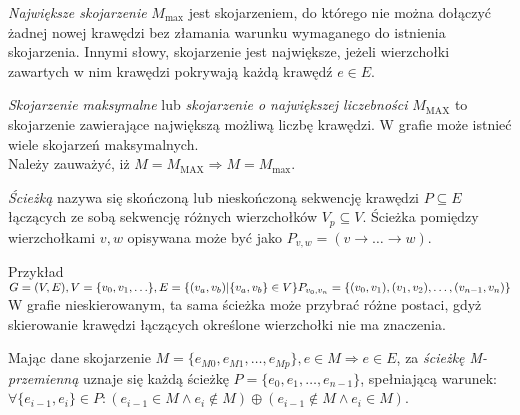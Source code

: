 \begin{definition}
  \emph{Największe skojarzenie} $M_{\max}$ jest skojarzeniem, do którego nie można
  dołączyć żadnej nowej krawędzi bez złamania warunku wymaganego do istnienia
  skojarzenia. 
  Innymi słowy, skojarzenie jest największe, jeżeli wierzchołki zawartych w nim
  krawędzi pokrywają każdą krawędź $e \in E$.
\end{definition}

\begin{definition}
  \emph{Skojarzenie maksymalne} lub \emph{skojarzenie o największej liczebności}
  $M_{\textrm{MAX}}$ to skojarzenie zawierające największą możliwą liczbę krawędzi.
  W grafie może istnieć wiele skojarzeń maksymalnych.\\
  Należy zauważyć, iż $M=M_{\textrm{MAX}} \Rightarrow M=M_{\max}$.
\end{definition}

\begin{definition}
  \emph{Ścieżką} nazywa się skończoną lub nieskończoną sekwencję krawędzi 
  $P \subseteq E$ łączących ze sobą sekwencję różnych wierzchołków
  $V_p \subseteq V$.
  Ścieżka pomiędzy wierzchołkami $v,w$ opisywana może być jako $P_{v,w} = (v
  \rightarrow \ldots \rightarrow w)$.
  \begin{example}{Przykład}\\
    $G=(V,E), V=\{v_0, v_1, \ldots\}, E=\{(v_a, v_b)| \{v_a, v_b\} \in V\}\\
    P_{v_0, v_n}=\{(v_0, v_1), (v_1, v_2), \ldots, (v_{n-1}, v_n)\}$\\

    W grafie nieskierowanym, ta sama ścieżka może przybrać różne postaci, gdyż
    skierowanie krawędzi łączących określone wierzchołki nie ma znaczenia.
  \end{example}
\end{definition}

\begin{definition}
  Mając dane skojarzenie ${M=\{e_{M0}, e_{M1}, \ldots, e_{Mp}\}, e \in M \Rightarrow e \in E}$,
  za \emph{ścieżkę M-przemienną} uznaje się każdą ścieżkę $P=\{e_0, e_1, \ldots,
  e_{n-1}\}$, spełniającą warunek: 
  ${\forall{\{e_{i-1}, e_i\} \in P}: (e_{i-1} \in M \land e_{i} \notin M) \oplus
  (e_{i-1} \notin M \land e_{i} \in M)}$.
\end{definition}